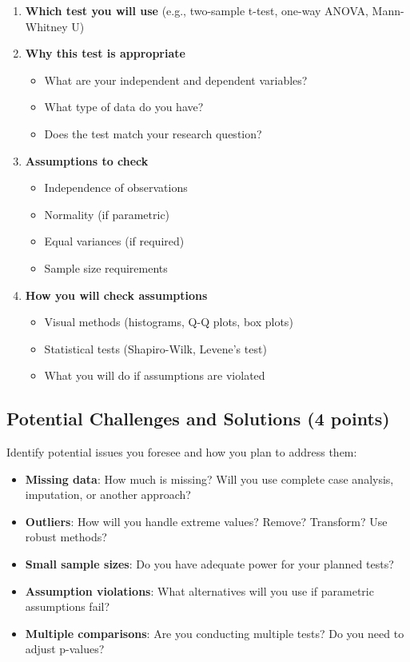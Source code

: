 \documentclass[11pt]{article}
\begin{document}
\begin{enumerate}
\item \textbf{Which test you will use} (e.g., two-sample t-test, one-way ANOVA, Mann-Whitney U)
\item \textbf{Why this test is appropriate}
  \begin{itemize}
  \item What are your independent and dependent variables?
  \item What type of data do you have?
  \item Does the test match your research question?
  \end{itemize}
\item \textbf{Assumptions to check}
  \begin{itemize}
  \item Independence of observations
  \item Normality (if parametric)
  \item Equal variances (if required)
  \item Sample size requirements
  \end{itemize}
\item \textbf{How you will check assumptions}
  \begin{itemize}
  \item Visual methods (histograms, Q-Q plots, box plots)
  \item Statistical tests (Shapiro-Wilk, Levene's test)
  \item What you will do if assumptions are violated
  \end{itemize}
\end{enumerate}

\subsection{Potential Challenges and Solutions (4 points)}

Identify potential issues you foresee and how you plan to address them:

\begin{itemize}
\item \textbf{Missing data}: How much is missing? Will you use complete case analysis, imputation, or another approach?
\item \textbf{Outliers}: How will you handle extreme values? Remove? Transform? Use robust methods?
\item \textbf{Small sample sizes}: Do you have adequate power for your planned tests?
\item \textbf{Assumption violations}: What alternatives will you use if parametric assumptions fail?
\item \textbf{Multiple comparisons}: Are you conducting multiple tests? Do you need to adjust p-values?
\end{itemize}
\end{document}
